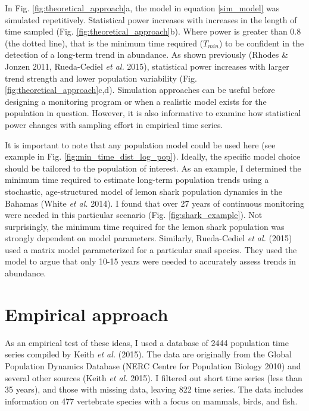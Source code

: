 \documentclass[12pt,]{article}
\begin{document}
In Fig. \ref{fig:theoretical_approach}a, the model in equation
\ref{sim_model} was simulated repetitively. Statistical power increases
with increases in the length of time sampled (Fig.
\ref{fig:theoretical_approach}b). Where power is greater than 0.8 (the
dotted line), that is the minimum time required (\(T_{min}\)) to be
confident in the detection of a long-term trend in abundance. As shown
previously (Rhodes \& Jonzen 2011, Rueda-Cediel \emph{et al.} 2015),
statistical power increases with larger trend strength and lower
population variability (Fig. \ref{fig:theoretical_approach}c,d).
Simulation approaches can be useful before designing a monitoring
program or when a realistic model exists for the population in question.
However, it is also informative to examine how statistical power changes
with sampling effort in empirical time series.

It is important to note that any population model could be used here
(see example in Fig. \ref{fig:min_time_dist_log_pop}). Ideally, the
specific model choice should be tailored to the population of interest.
As an example, I determined the minimum time required to estimate
long-term population trends using a stochastic, age-structured model of
lemon shark population dynamics in the Bahamas (White \emph{et al.}
2014). I found that over 27 years of continuous monitoring were needed
in this particular scenario (Fig. \ref{fig:shark_example}). Not
surprisingly, the minimum time required for the lemon shark population
was strongly dependent on model parameters. Similarly, Rueda-Cediel
\emph{et al.} (2015) used a matrix model parameterized for a particular
snail species. They used the model to argue that only 10-15 years were
needed to accurately assess trends in abundance.

\section{Empirical approach}\label{empirical-approach}

As an empirical test of these ideas, I used a database of 2444
population time series compiled by Keith \emph{et al.} (2015). The data
are originally from the Global Population Dynamics Database (NERC Centre
for Population Biology 2010) and several other sources (Keith \emph{et
al.} 2015). I filtered out short time series (less than 35 years), and
those with missing data, leaving 822 time series. The data includes
information on 477 vertebrate species with a focus on mammals, birds,
and fish.
\end{document}
